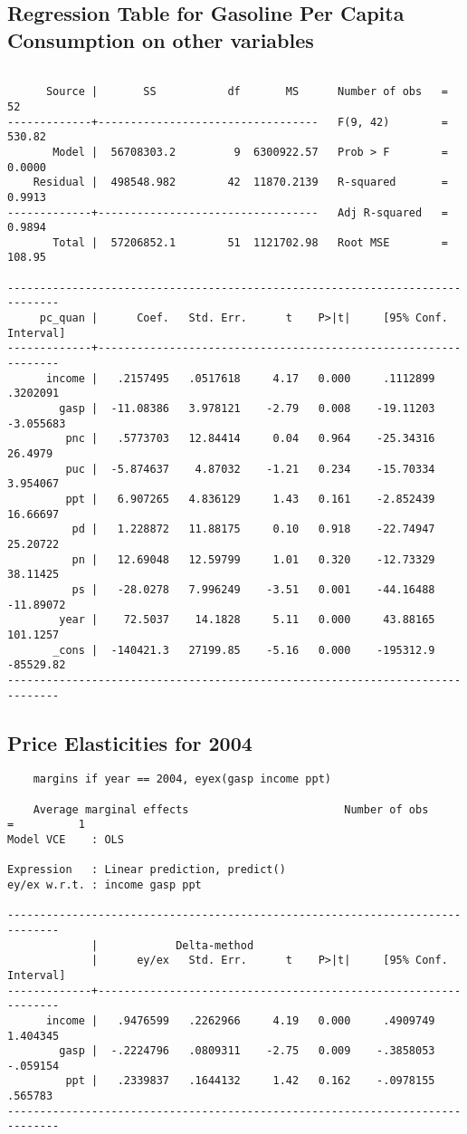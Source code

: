 \documentclass{article}
\begin{document}
\subsection*{Regression Table for Gasoline Per Capita Consumption on other variables}
\begin{verbatim}

      Source |       SS           df       MS      Number of obs   =        52
-------------+----------------------------------   F(9, 42)        =    530.82
       Model |  56708303.2         9  6300922.57   Prob > F        =    0.0000
    Residual |  498548.982        42  11870.2139   R-squared       =    0.9913
-------------+----------------------------------   Adj R-squared   =    0.9894
       Total |  57206852.1        51  1121702.98   Root MSE        =    108.95

------------------------------------------------------------------------------
     pc_quan |      Coef.   Std. Err.      t    P>|t|     [95% Conf. Interval]
-------------+----------------------------------------------------------------
      income |   .2157495   .0517618     4.17   0.000     .1112899    .3202091
        gasp |  -11.08386   3.978121    -2.79   0.008    -19.11203   -3.055683
         pnc |   .5773703   12.84414     0.04   0.964    -25.34316     26.4979
         puc |  -5.874637    4.87032    -1.21   0.234    -15.70334    3.954067
         ppt |   6.907265   4.836129     1.43   0.161    -2.852439    16.66697
          pd |   1.228872   11.88175     0.10   0.918    -22.74947    25.20722
          pn |   12.69048   12.59799     1.01   0.320    -12.73329    38.11425
          ps |   -28.0278   7.996249    -3.51   0.001    -44.16488   -11.89072
        year |    72.5037    14.1828     5.11   0.000     43.88165    101.1257
       _cons |  -140421.3   27199.85    -5.16   0.000    -195312.9   -85529.82
------------------------------------------------------------------------------	
\end{verbatim}


\subsection*{Price Elasticities for 2004}

\begin{verbatim}
	margins if year == 2004, eyex(gasp income ppt)
	
	Average marginal effects                        Number of obs     =          1
Model VCE    : OLS

Expression   : Linear prediction, predict()
ey/ex w.r.t. : income gasp ppt

------------------------------------------------------------------------------
             |            Delta-method
             |      ey/ex   Std. Err.      t    P>|t|     [95% Conf. Interval]
-------------+----------------------------------------------------------------
      income |   .9476599   .2262966     4.19   0.000     .4909749    1.404345
        gasp |  -.2224796   .0809311    -2.75   0.009    -.3858053    -.059154
         ppt |   .2339837   .1644132     1.42   0.162    -.0978155     .565783
------------------------------------------------------------------------------
\end{verbatim}
\end{document}
